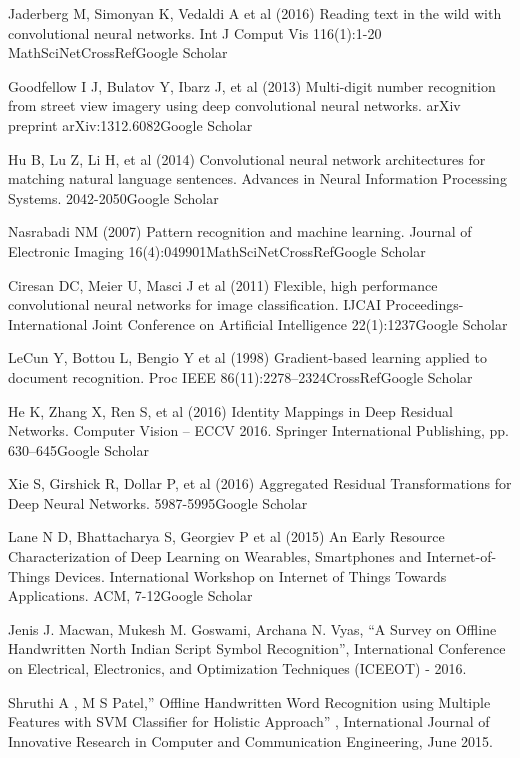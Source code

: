\documentclass[a4paper,12pt]{report}
\begin{document}
\begin{thebibliography}{2}
Jaderberg M, Simonyan K, Vedaldi A et al (2016) Reading text in the wild with convolutional neural networks. Int J Comput Vis 116(1):1-20 MathSciNetCrossRefGoogle Scholar

Goodfellow I J, Bulatov Y, Ibarz J, et al (2013) Multi-digit number recognition from street view imagery using deep convolutional neural networks. arXiv preprint arXiv:1312.6082Google Scholar

Hu B, Lu Z, Li H, et al (2014) Convolutional neural network architectures for matching natural language sentences. Advances in Neural Information Processing Systems. 2042-2050Google Scholar


Nasrabadi NM (2007) Pattern recognition and machine learning. Journal of Electronic Imaging 16(4):049901MathSciNetCrossRefGoogle Scholar

Ciresan DC, Meier U, Masci J et al (2011) Flexible, high performance convolutional neural networks for image classification. IJCAI Proceedings-International Joint Conference on Artificial Intelligence 22(1):1237Google Scholar


LeCun Y, Bottou L, Bengio Y et al (1998) Gradient-based learning applied to document recognition. Proc IEEE 86(11):2278–2324CrossRefGoogle Scholar

He K, Zhang X, Ren S, et al (2016) Identity Mappings in Deep Residual Networks. Computer Vision – ECCV 2016. Springer International Publishing, pp. 630–645Google Scholar

Xie S, Girshick R, Dollar P, et al (2016) Aggregated Residual Transformations for Deep Neural Networks. 5987-5995Google Scholar

Lane N D, Bhattacharya S, Georgiev P et al (2015) An Early Resource Characterization of Deep Learning on Wearables, Smartphones and Internet-of-Things Devices. International Workshop on Internet of Things Towards Applications. ACM, 7-12Google Scholar

Jenis J. Macwan, Mukesh M. Goswami, Archana N. Vyas, “A Survey on Offline Handwritten North Indian Script Symbol Recognition”, International Conference on Electrical, Electronics, and Optimization Techniques (ICEEOT) - 2016. 

Shruthi A , M S Patel,” Offline Handwritten Word Recognition using Multiple Features with SVM Classifier for Holistic Approach” , International Journal of Innovative Research in Computer and Communication Engineering, June 2015.


\end{thebibliography}
\end{document}
